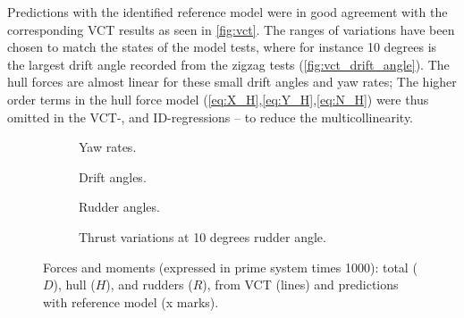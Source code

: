 Predictions with the identified reference model were in good agreement with the corresponding VCT results as seen in \autoref{fig:vct}. The ranges of variations have been chosen to match the states of the model tests, where for instance 10 degrees is the largest drift angle recorded from the zigzag tests (\autoref{fig:vct_drift_angle}). The hull forces are almost linear for these small drift angles and yaw rates; The higher order terms in the hull force model (\autoref{eq:X_H},\autoref{eq:Y_H},\autoref{eq:N_H}) were thus omitted in the VCT-, and ID-regressions -- to reduce the multicollinearity.
\begin{figure}
    \centering
    \begin{subfigure}[b]{0.49\textwidth}
        \centering
        
        \caption{Yaw rates.}
        \label{fig:vct_circle}
    \end{subfigure}
    \hfill
    \begin{subfigure}[b]{0.49\textwidth}
        \centering
        
        \caption{Drift angles.}
        \label{fig:vct_drift_angle}
    \end{subfigure}
    \begin{subfigure}[b]{0.49\textwidth}
        \centering
        
        \caption{Rudder angles.}
        \label{fig:vct_rudder_angle}
    \end{subfigure}
    \hfill
    \begin{subfigure}[b]{0.49\textwidth}
        \centering
        
        \caption{Thrust variations at 10 degrees rudder angle.}
        \label{fig:vct_thrust_variation}
    \end{subfigure}
    \caption{Forces and moments (expressed in prime system times 1000): total ($D$), hull ($H$), and rudders ($R$), from VCT (lines) and predictions with reference model (x marks).}
    \label{fig:vct}
\end{figure}